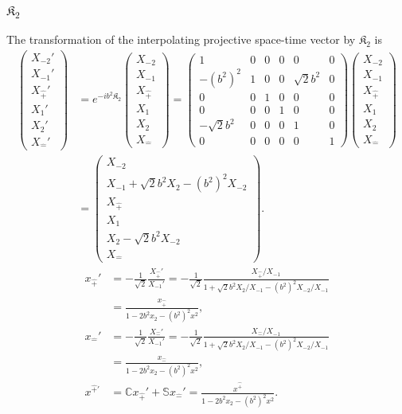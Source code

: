 \documentclass[foundations,article,submit,pdftex,moreauthors]{Definitions/mdpi}
\begin{document}
\subsubsection{\texorpdfstring{$\mathfrak{K}_{2}$}{K2}}

The transformation of the interpolating projective space-time vector by
$\mathfrak{K}_2$ is
\begin{align}
\begin{pmatrix}
X_{-2}'\\ X_{-1}'\\ X_{\hat{+}}'\\ X_1'\\ X_2'\\ X_{\hat{-}}'
\end{pmatrix}
&=e^{-ib^2\mathfrak{K}_2}
\begin{pmatrix}
X_{-2}\\ X_{-1}\\ X_{\hat{+}}\\ X_1\\ X_2\\ X_{\hat{-}}
\end{pmatrix}
=\begin{pmatrix}
1 & 0 & 0 & 0 & 0 & 0\\
- (b^{2})^{2} & 1 & 0 & 0 & \sqrt{2} b^{2} & 0\\
0 & 0 & 1 & 0 & 0 & 0\\
0 & 0 & 0 & 1 & 0 & 0\\
- \sqrt{2} b^{2} & 0 & 0 & 0 & 1 & 0\\
0 & 0 & 0 & 0 & 0 & 1
\end{pmatrix}
\begin{pmatrix}
X_{-2}\\ X_{-1}\\ X_{\hat{+}}\\ X_1\\ X_2\\ X_{\hat{-}}
\end{pmatrix}\\
&=\begin{pmatrix}
X_{-2}\\
X_{-1}+\sqrt{2}b^2X_2-(b^2)^2X_{-2}\\
X_{\hat{+}}\\
X_1\\
X_2-\sqrt{2}b^2X_{-2}\\
X_{\hat{-}}
\end{pmatrix}.
\end{align}
\begin{align}
x_{\hat{+}}'
&=-\frac{1}{\sqrt{2}}\frac{X_{\hat{+}}'}{X_{-1}'}
=-\frac{1}{\sqrt{2}}
\frac{X_{\hat{+}}/X_{-1}}
{1+\sqrt{2}b^2X_2/X_{-1}-(b^2)^2X_{-2}/X_{-1}}\nonumber\\
&=\frac{x_{\hat{+}}}{1-2b^2x_2-(b^2)^2x^2}, \nonumber\\
x_{\hat{-}}'
&=-\frac{1}{\sqrt{2}}\frac{X_{\hat{-}}'}{X_{-1}'}
=-\frac{1}{\sqrt{2}}
\frac{X_{\hat{-}}/X_{-1}}
{1+\sqrt{2}b^2X_2/X_{-1}-(b^2)^2X_{-2}/X_{-1}}\nonumber\\
&=\frac{x_{\hat{-}}}{1-2b^2x_2-(b^2)^2x^2}, \nonumber\\
x^{\hat{+}\prime}
&=\mathbb{C}x_{\hat{+}}'+\mathbb{S}x_{\hat{-}}'
=\frac{x^{\hat{+}}}{1-2b^2x_2-(b^2)^2x^2}.
\end{align}
\end{document}
